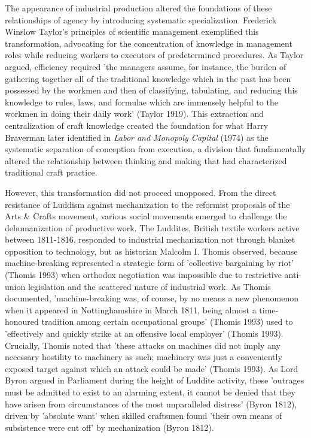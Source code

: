 The appearance of industrial production altered the foundations of these relationships of agency by introducing systematic specialization. Frederick Winslow Taylor's principles of scientific management exemplified this transformation, advocating for the concentration of knowledge in management roles while reducing workers to executors of predetermined procedures. As Taylor argued, efficiency required 'the managers assume, for instance, the burden of gathering together all of the traditional knowledge which in the past has been possessed by the workmen and then of classifying, tabulating, and reducing this knowledge to rules, laws, and formulae which are immensely helpful to the workmen in doing their daily work' (Taylor 1919). This extraction and centralization of craft knowledge created the foundation for what Harry Braverman later identified in \textit{Labor and Monopoly Capital} (1974) as the systematic separation of conception from execution, a division that fundamentally altered the relationship between thinking and making that had characterized traditional craft practice.

\vspace{0.5cm}

However, this transformation did not proceed unopposed. From the direct resistance of Luddism against mechanization to the reformist proposals of the Arts \& Crafts movement, various social movements emerged to challenge the dehumanization of productive work. The Luddites, British textile workers active between 1811-1816, responded to industrial mechanization not through blanket opposition to technology, but as historian Malcolm I. Thomis observed, because machine-breaking represented a strategic form of 'collective bargaining by riot' (Thomis 1993) when orthodox negotiation was impossible due to restrictive anti-union legislation and the scattered nature of industrial work. As Thomis documented, 'machine-breaking was, of course, by no means a new phenomenon when it appeared in Nottinghamshire in March 1811, being almost a time-honoured tradition among certain occupational groups' (Thomis 1993) used to 'effectively and quickly strike at an offensive local employer' (Thomis 1993). Crucially, Thomis noted that 'these attacks on machines did not imply any necessary hostility to machinery as such; machinery was just a conveniently exposed target against which an attack could be made' (Thomis 1993). As Lord Byron argued in Parliament during the height of Luddite activity, these 'outrages must be admitted to exist to an alarming extent, it cannot be denied that they have arisen from circumstances of the most unparalleled distress' (Byron 1812), driven by 'absolute want' when skilled craftsmen found 'their own means of subsistence were cut off' by mechanization (Byron 1812).


